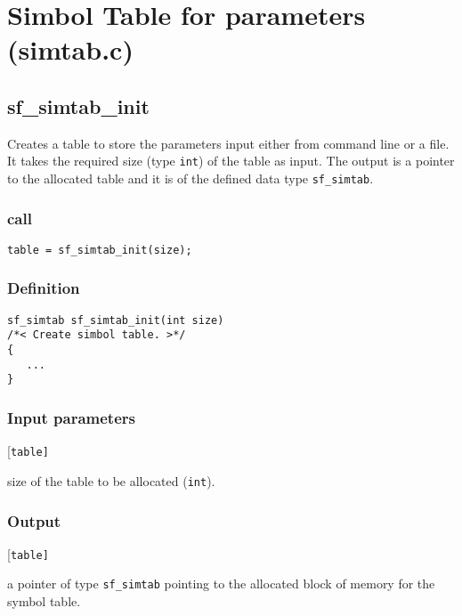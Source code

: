 \section{Simbol Table for parameters (simtab.c)}




\subsection{{sf\_simtab\_init}}\label{sec:sf_simtab_init}
Creates a table to store the parameters input either from command line or a file. It takes the required size (type \texttt{int}) of the table as input. The output is a pointer to the allocated table and it is of the defined data type \texttt{sf\_simtab}.

\subsubsection*{call}
\begin{verbatim}table = sf_simtab_init(size);\end{verbatim}

\subsubsection*{Definition}
\begin{verbatim}
sf_simtab sf_simtab_init(int size)
/*< Create simbol table. >*/
{
   ...
}
\end{verbatim}

\subsubsection*{Input parameters}
\begin{desclist}{\tt }{\quad}[\tt table]
   \setlength\itemsep{0pt}
   \item[size] size of the table to be allocated (\texttt{int}).
\end{desclist}

\subsubsection*{Output}
\begin{desclist}{\tt }{\quad}[\tt table]
   \setlength\itemsep{0pt}
   \item[table] a pointer of type \texttt{sf\_simtab} pointing to the allocated block of memory for the symbol table.
\end{desclist}




